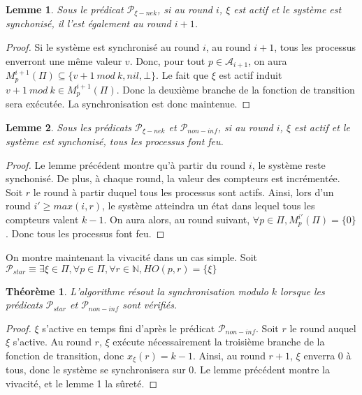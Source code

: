 \documentclass{article}
\newtheorem{lemma}{Lemme}
\newtheorem{theorem}{Théorème}
\begin{document}
\begin{lemma}
	Sous le prédicat $\mathcal{P}_{\xi-nek}$,
	si au round $i$, $\xi$ est actif et le système est synchonisé, il l'est également au round $i+1$.
\end{lemma}
\begin{proof}
	Si le système est synchronisé au round $i$, au round $i+1$, tous les processus enverront une même valeur $v$.
	Donc, pour tout $p \in \mathcal{A}_{i+1}$, on aura $M_p^{i+1}(\Pi) \subseteq \{v+1~mod~k, nil, \bot\}$.
	Le fait que $\xi$ est actif induit $v+1~mod~k \in M_p^{i+1}(\Pi)$.
	Donc la deuxième branche de la fonction de transition sera exécutée.
	La synchronisation est donc maintenue.
\end{proof}
\begin{lemma}
	Sous les prédicats $\mathcal{P}_{\xi-nek}$ et $\mathcal{P}_{non-inf}$,
	si au round $i$, $\xi$ est actif et le système est synchonisé, tous les processus font feu.
\end{lemma}
\begin{proof}
	Le lemme précédent montre qu'à partir du round $i$, le système reste synchonisé. De plus, à chaque round, la valeur des compteurs est incrémentée.
	Soit $r$ le round à partir duquel tous les processus sont actifs.
	Ainsi, lors d'un round $i' \geq max(i, r)$, le système atteindra un état dans lequel tous les compteurs valent $k-1$.
	On aura alors, au round suivant, $\forall p \in \Pi, M_p^{i'}(\Pi) = \{0\}$.
	Donc tous les processus font feu.
\end{proof}

On montre maintenant la vivacité dans un cas simple.
Soit $\mathcal{P}_{star} \equiv \exists \xi \in \Pi, \forall p \in \Pi, \forall r \in \mathds{N}, HO(p, r) = \{\xi\}$

\begin{theorem}
	L'algorithme résout la synchronisation modulo $k$ lorsque les prédicats $\mathcal{P}_{star}$ et $\mathcal{P}_{non-inf}$ sont vérifiés.
\end{theorem}
\begin{proof}
	$\xi$ s'active en temps fini d'après le prédicat $\mathcal{P}_{non-inf}$.
	Soit $r$ le round auquel $\xi$ s'active.
	Au round $r$, $\xi$ exécute nécessairement la troisième branche de la fonction de transition, donc $x_\xi(r) = k-1$.
	Ainsi, au round $r+1$, $\xi$ enverra 0 à tous, donc le système se synchronisera sur 0.
	Le lemme précédent montre la vivacité, et le lemme 1 la sûreté.
\end{proof}
\end{document}
